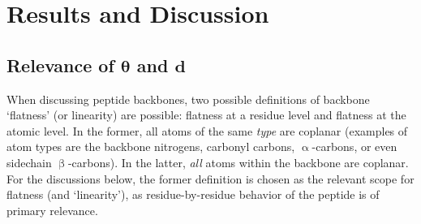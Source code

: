 \documentclass[fleqn,10pt,lineno]{wlpeerj} %
\newcommand{\n}[1]{{\color{blue}#1}}
\begin{document}
\section*{Results and Discussion}

\subsection*{Relevance of $\bm \theta$ and $\bm d$}

When discussing peptide backbones, two possible definitions of backbone `flatness' (or linearity) are possible: flatness at a residue level and flatness at the atomic level. In the former, all atoms of the same {\em type} are coplanar (examples of atom types are \n{the} backbone nitrogen\n{s}, carbonyl carbon\n{s}, $\upalpha$-carbon\n{s}, or even sidechain $\upbeta$-carbon\n{s}). In the latter, {\em all} atoms within the backbone are coplanar. \n{For the discussions below, the former definition is chosen as the relevant scope for flatness (and `linearity'), as residue-by-residue behavior of the peptide is of primary relevance.} 
\end{document}
